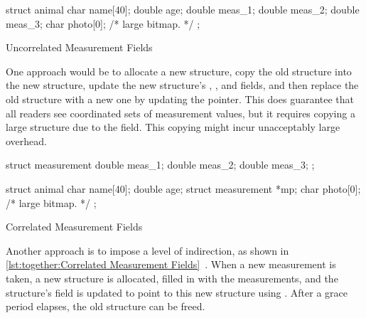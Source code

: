 \begin{listing}
\begin{VerbatimL}[tabsize=8]
struct animal {
	char name[40];
	double age;
	double meas_1;
	double meas_2;
	double meas_3;
	char photo[0]; /* large bitmap. */
};
\end{VerbatimL}
\caption{Uncorrelated Measurement Fields}
\label{lst:together:Uncorrelated Measurement Fields}
\end{listing}

One approach would be to allocate a new  structure,
copy the old structure into the new structure, update the new
structure's , , and  fields,
and then replace the old structure with a new one by updating
the pointer.
This does guarantee that all readers see coordinated sets of
measurement values, but it requires copying a large structure due
to the  field.
This copying might incur unacceptably large overhead.

\begin{listing}
\begin{VerbatimL}[tabsize=8]
struct measurement {
	double meas_1;
	double meas_2;
	double meas_3;
};

struct animal {
	char name[40];
	double age;
	struct measurement *mp;
	char photo[0]; /* large bitmap. */
};
\end{VerbatimL}
\caption{Correlated Measurement Fields}
\label{lst:together:Correlated Measurement Fields}
\end{listing}

Another approach is to impose a level of indirection, as shown in
\cref{lst:together:Correlated Measurement Fields}~\cite[Section 5.3.4]{PaulEdwardMcKenneyPhD}.
When a new measurement is taken, a new  structure
is allocated, filled in with the measurements, and the 
structure's  field is updated to point to this new
 structure using .
After a grace period elapses, the old  structure
can be freed.

